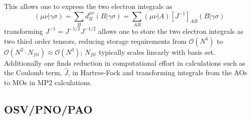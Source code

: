 		This allows one to express the two electron integrals as 
			\begin{equation}
				(\mu\nu|\gamma\sigma) = \sum_B d^{\mu\nu}_B (B|\gamma\sigma) = \sum_{AB} (\mu\nu|A)[J^{-1}]_{AB}(B|\gamma\sigma)
			\end{equation}
		transforming $J^{-1} = J^{-1/2}J^{-1/2}$ allows one to store the two electron integrals as two third order tensors, reducing storage requirements from $\mathcal{O}(N^4)$ to $\mathcal{O}(N^2\cdot N_{fit}) \approx \mathcal{O}(N^3)$; $N_{fit}$ typically scales linearly with basis set.  Additionally one finds reduction in computational effort in calculations such as the Coulomb term, $\hat{J}$, in Hartree-Fock and transforming integrals from the AOs to MOs in MP2 calculations.

	\subsection{OSV/PNO/PAO}%


